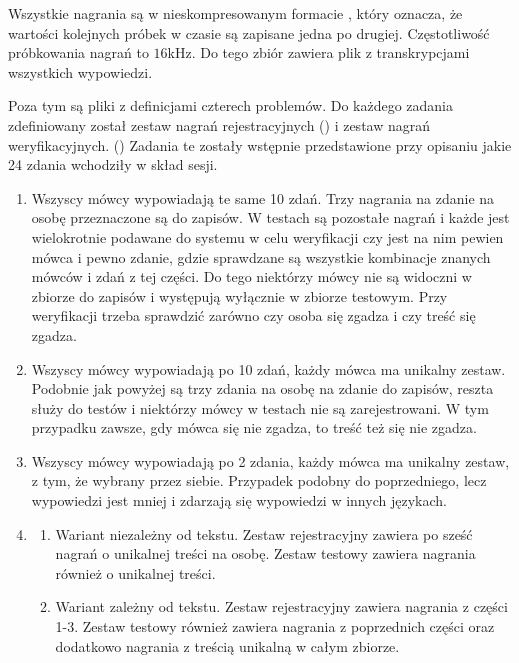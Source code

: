 Wszystkie nagrania są w nieskompresowanym formacie , który oznacza, że wartości kolejnych próbek w czasie
są zapisane jedna po drugiej. Częstotliwość próbkowania nagrań to $16$kHz. Do tego zbiór zawiera plik z transkrypcjami
wszystkich wypowiedzi.

Poza tym są pliki z definicjami czterech problemów. Do każdego zadania zdefiniowany został zestaw nagrań rejestracyjnych
() i zestaw nagrań weryfikacyjnych. () Zadania te zostały wstępnie przedstawione
przy opisaniu jakie 24 zdania wchodziły w skład sesji.

\begin{enumerate}
    \item Wszyscy mówcy wypowiadają te same 10 zdań. Trzy nagrania na zdanie na osobę przeznaczone są do zapisów. W testach
        są pozostałe nagrań i każde jest wielokrotnie podawane do systemu w celu weryfikacji czy jest na nim pewien mówca
        i pewno zdanie, gdzie sprawdzane są wszystkie kombinacje znanych mówców i zdań z tej części. Do tego niektórzy
        mówcy nie są widoczni w zbiorze do zapisów i występują wyłącznie w zbiorze testowym. Przy weryfikacji trzeba
        sprawdzić zarówno czy osoba się zgadza i czy treść się zgadza.
    \item Wszyscy mówcy wypowiadają po 10 zdań, każdy mówca ma unikalny zestaw. Podobnie jak powyżej są
        trzy zdania na osobę na zdanie do zapisów, reszta służy do testów i niektórzy mówcy w testach nie są zarejestrowani.
        W tym przypadku zawsze, gdy mówca się nie zgadza, to treść też się nie zgadza.
    \item Wszyscy mówcy wypowiadają po 2 zdania, każdy mówca ma unikalny zestaw, z tym, że wybrany przez siebie.
        Przypadek podobny do poprzedniego, lecz wypowiedzi jest mniej i zdarzają się wypowiedzi w innych językach.
    \item
        \begin{enumerate}
            \item Wariant niezależny od tekstu. Zestaw rejestracyjny zawiera po sześć nagrań o unikalnej treści na osobę.
                Zestaw testowy zawiera nagrania również o unikalnej treści.
            \item Wariant zależny od tekstu. Zestaw rejestracyjny zawiera nagrania z części 1-3. Zestaw testowy również
                zawiera nagrania z poprzednich części oraz dodatkowo nagrania z treścią unikalną w całym zbiorze.
        \end{enumerate}
\end{enumerate}

